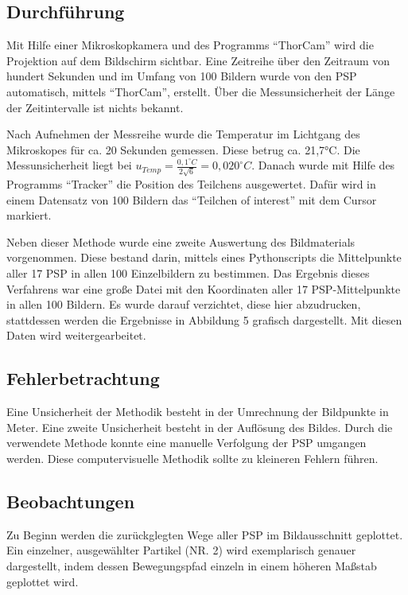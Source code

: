 \documentclass[class=article, crop=false]{standalone}
\begin{document}
\hypertarget{durchfuxfchrung}{%
\subsection{Durchführung}\label{durchfuxfchrung}}

Mit Hilfe einer Mikroskopkamera und des Programms ``ThorCam'' wird die
Projektion auf dem Bildschirm sichtbar. Eine Zeitreihe über den Zeitraum
von hundert Sekunden und im Umfang von 100 Bildern wurde von den PSP
automatisch, mittels ``ThorCam'', erstellt. Über die Messunsicherheit
der Länge der Zeitintervalle ist nichts bekannt.

Nach Aufnehmen der Messreihe wurde die Temperatur im Lichtgang des
Mikroskopes für ca. 20 Sekunden gemessen. Diese betrug ca. 21,7°C. Die
Messunsicherheit liegt bei
\(u_{Temp}=\frac{0,1^{\circ}C}{2\sqrt{6}}= 0,020^{\circ}C\). Danach
wurde mit Hilfe des Programms ``Tracker'' die Position des Teilchens
ausgewertet. Dafür wird in einem Datensatz von 100 Bildern das
``Teilchen of interest'' mit dem Cursor markiert.

Neben dieser Methode wurde eine zweite Auswertung des Bildmaterials
vorgenommen. Diese bestand darin, mittels eines Pythonscripts die
Mittelpunkte aller 17 PSP in allen 100 Einzelbildern zu bestimmen. Das
Ergebnis dieses Verfahrens war eine große Datei mit den Koordinaten
aller 17 PSP-Mittelpunkte in allen 100 Bildern. Es wurde darauf
verzichtet, diese hier abzudrucken, stattdessen werden die Ergebnisse in
Abbildung 5 grafisch dargestellt. Mit diesen Daten wird
weitergearbeitet.

\hypertarget{fehlerbetrachtung}{%
\subsection{Fehlerbetrachtung}\label{fehlerbetrachtung}}

Eine Unsicherheit der Methodik besteht in der Umrechnung der Bildpunkte
in Meter. Eine zweite Unsicherheit besteht in der Auflösung des Bildes.
Durch die verwendete Methode konnte eine manuelle Verfolgung der PSP
umgangen werden. Diese computervisuelle Methodik sollte zu kleineren
Fehlern führen.

\hypertarget{beobachtungen}{%
\subsection{Beobachtungen}\label{beobachtungen}}

Zu Beginn werden die zurückglegten Wege aller PSP im Bildausschnitt
geplottet. Ein einzelner, ausgewählter Partikel (NR. 2) wird
exemplarisch genauer dargestellt, indem dessen Bewegungspfad einzeln in
einem höheren Maßstab geplottet wird.
\end{document}
